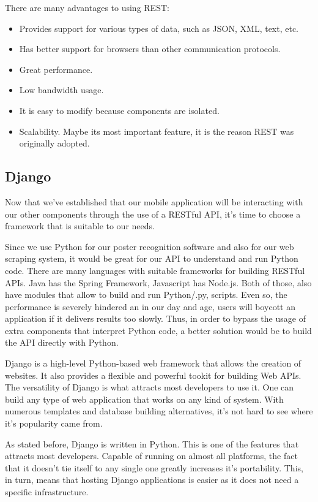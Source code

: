 \documentclass[12pt,a4paper,twoside]{report}
\begin{document}
There are many advantages to using REST:
\begin{itemize}
    \item Provides support for various types of data, such as JSON, XML, text, etc.
    \item Has better support for browsers than other communication protocols.
    \item Great performance.
    \item Low bandwidth usage.
    \item It is easy to modify because components are isolated.
    \item Scalability. Maybe its most important feature, it is the reason REST was originally adopted. 
\end{itemize}

\subsection{Django}
 Now that we've established that our mobile application will be interacting with our other components through the use of a RESTful API, it's time to choose a framework that is suitable to our needs.
 
 Since we use Python for our poster recognition software and also for our web scraping system, it would be great for our API to understand and run Python code. There are many languages with suitable frameworks for building RESTful APIs. Java has the Spring Framework, Javascript has Node.js. Both of those, also have modules that allow to build and run Python/.py, scripts. Even so, the performance is severely hindered an in our day and age, users will boycott an application if it delivers results too slowly. Thus, in order to bypass the usage of extra components that interpret Python code, a better solution would be to build the API directly with Python.
 
 Django is a high-level Python-based web framework that allows the creation of websites. It also provides a flexible and powerful tookit for building Web APIs. The versatility of Django is what attracts most developers to use it. One can build any type of web application that works on any kind of system. With numerous templates and database building alternatives, it's not hard to see where it's popularity came from.
 
 As stated before, Django is written in Python. This is one of the features that attracts most developers. Capable of running on almost all platforms, the fact that it doesn't tie itself to any single one greatly increases it's portability. This, in turn, means that hosting Django applications is easier as it does not need a specific infrastructure. 
 
\end{document}
